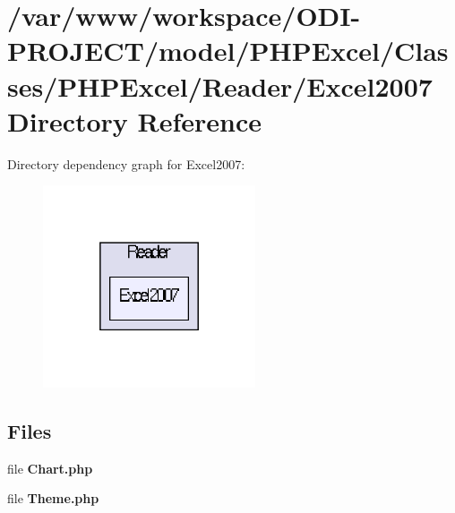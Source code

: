 \section{/var/www/workspace/\+O\+D\+I-\/\+P\+R\+O\+J\+E\+C\+T/model/\+P\+H\+P\+Excel/\+Classes/\+P\+H\+P\+Excel/\+Reader/\+Excel2007 Directory Reference}
\label{dir_b17a356be795aff71ddae626e2e76e9b}
Directory dependency graph for Excel2007\+:\nopagebreak
\begin{figure}[H]
\begin{center}
\leavevmode
\includegraphics[width=178pt]{dir_b17a356be795aff71ddae626e2e76e9b_dep}
\end{center}
\end{figure}
\subsection*{Files}
\begin{DoxyCompactItemize}
\item 
file {\bfseries Chart.\+php}
\item 
file {\bfseries Theme.\+php}
\end{DoxyCompactItemize}
